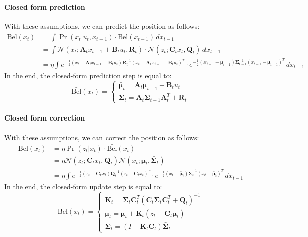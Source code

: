 \paragraph*{Closed form prediction}
With these assumptions, we can predict the position as follows:
\begin{align*}
    \bar{\text{Bel}}(x_t)   &=\int\Pr(x_t|u_t,x_{t-1})\cdot\text{Bel}(x_{t-1})\,dx_{t-1} \\
                            &=\int\mathcal{N}(x_t;\mathbf{A}_tx_{t-1}+\mathbf{B}_tu_t,\mathbf{R}_t)\cdot\mathcal{N}(z_t;\mathbf{C}_tx_t,\mathbf{Q}_t)\,dx_{t-1} \\
                            &=\eta\int e^{-\frac{1}{2}(x_t-\mathbf{A}_tx_{t-1}-\mathbf{B}_tu_t)\mathbf{R}_t^{-1}(x_t-\mathbf{A}_tx_{t-1}-\mathbf{B}_tu_t)^T}\cdot e^{-\frac{1}{2}(x_{t-1}-\boldsymbol{\mu}_{t-1})\mathbf{\Sigma}_{t-1}^{-1}(x_{t-1}-\boldsymbol{\mu}_{t-1})^T}\,dx_{t-1}
\end{align*}
In the end, the closed-form prediction step is equal to:
\[\bar{\text{Bel}}(x_t)=\begin{cases}
    \bar{\boldsymbol{\mu}}_t=\mathbf{A}_t\boldsymbol{\mu}_{t-1}+\mathbf{B}_tu_t \\
    \bar{\mathbf{\Sigma}}_t=\mathbf{A}_t\mathbf{\Sigma}_{t-1}\mathbf{A}_t^T+\mathbf{R}_t
\end{cases}\]

\paragraph*{Closed form correction}
With these assumptions, we can correct the position as follows:
\begin{align*}
    \text{Bel}(x_t) &=\eta\Pr(z_t|x_t)\cdot\bar{\text{Bel}}(x_t) \\
                    &=\eta\mathcal{N}(z_t;\mathbf{C}_tx_t,\mathbf{Q}_t)\mathcal{N}(x_t;\bar{\boldsymbol{\mu}}_t,\bar{\boldsymbol{\Sigma}}_t) \\
                    &=\eta\int e^{-\frac{1}{2}(z_t-\mathbf{C}_tx_t)\mathbf{Q}_t^{-1}(z_t-\mathbf{C}_tx_t)^T}\cdot e^{-\frac{1}{2}(x_t-\bar{\boldsymbol{\mu}}_t)  \bar{\mathbf{\Sigma}}_t^{-1}   (x_t-\bar{\boldsymbol{\mu}}_t)^T}\,dx_{t-1}
\end{align*}
In the end, the closed-form update step is equal to:
\[\text{Bel}(x_t)=\begin{cases}
    \mathbf{K}_t=\bar{\mathbf{\Sigma}}_t\mathbf{C}_t^T\left(\mathbf{C}_t\bar{\mathbf{\Sigma}}_t\mathbf{C}_t^T+\mathbf{Q}_t\right)^{-1} \\
    \boldsymbol{\mu}_t=\bar{\boldsymbol{\mu}}_t+\mathbf{K}_t(z_t-\mathbf{C}_t\bar{\boldsymbol{\mu}}_t) \\
    \mathbf{\Sigma}_t=(I-\mathbf{K}_t\mathbf{C}_t)\bar{\mathbf{\Sigma}}_t
\end{cases}\]

